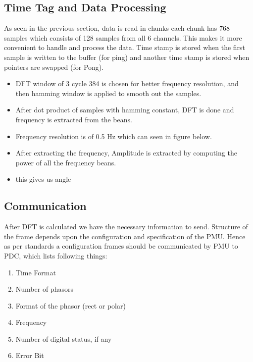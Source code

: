 \subsection{Time Tag and Data Processing}

As seen in the previous section, data is read in chunks each chunk has 768 samples which consists of 128 samples from all 6 channels. This makes it more convenient to handle and process the data. Time stamp is stored when the first sample is written to the buffer (for ping) and another time stamp is stored when pointers are swapped (for Pong). 
\begin{itemize}
	\item DFT window of 3 cycle 384 is chosen for better frequency resolution, and then hamming window is applied to smooth out the samples.
	\item After dot product of samples with hamming constant, DFT is done and frequency is extracted from the beans. 
	\item Frequency resolution is of 0.5 Hz which can seen in figure below.
	\item After extracting the frequency, Amplitude is extracted by computing the power of all the frequency beans.
	\item this gives us angle 
\end{itemize}

\subsection{Communication}
After DFT is calculated we have the necessary information to send. Structure of the frame depends upon the configuration and specification of the PMU. Hence as per standards a configuration frames should be communicated by PMU to PDC, which lists following things:
\begin{enumerate}
	\item Time Format 
	\item Number of phasors
	\item Format of the phasor (rect or polar)
	\item Frequency
	\item Number of digital status, if any
	\item Error Bit
\end{enumerate}